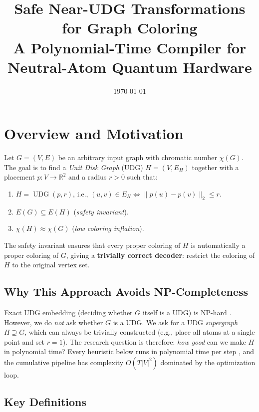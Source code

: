 \documentclass[11pt]{article}
\title{%
  \textbf{Safe Near-UDG Transformations for Graph Coloring}\\[0.4em]
  \large A Polynomial-Time Compiler for Neutral-Atom Quantum Hardware
}
\author{}
\date{\today}
\newcommand{\UDG}{\operatorname{UDG}}
\newcommand{\R}{\mathbb{R}}
\begin{document}
\maketitle
\tableofcontents
\newpage

\section{Overview and Motivation}

Let $G = (V, E)$ be an arbitrary input graph with chromatic number $\chi(G)$.
The goal is to find a \emph{Unit Disk Graph} (UDG) $H = (V, E_H)$ together
with a placement $p : V \to \R^2$ and a radius $r > 0$ such that:
\begin{enumerate}
  \item $H = \UDG(p, r)$, i.e., $(u,v) \in E_H \iff \|p(u)-p(v)\|_2 \leq r$.
  \item $E(G) \subseteq E(H)$ \quad (\emph{safety invariant}).
  \item $\chi(H) \approx \chi(G)$ \quad (\emph{low coloring inflation}).
\end{enumerate}

The safety invariant ensures that every proper coloring of $H$ is
automatically a proper coloring of $G$, giving a \textbf{trivially correct
decoder}: restrict the coloring of $H$ to the original vertex set.

\subsection{Why This Approach Avoids NP-Completeness}

Exact UDG embedding (deciding whether $G$ itself is a UDG) is NP-hard \cite{Breu1998,Jungck2021}.
However, we do \emph{not} ask whether $G$ is a UDG. We ask for a UDG
\emph{supergraph} $H \supseteq G$, which can always be trivially constructed
(e.g., place all atoms at a single point and set $r = 1$). The research
question is therefore: \emph{how good} can we make $H$ in polynomial time?
Every heuristic below runs in polynomial time per step \cite{Cormen2009}, and the cumulative
pipeline has complexity $O(T|V|^2)$ dominated by the optimization loop.

\subsection{Key Definitions}
\end{document}

